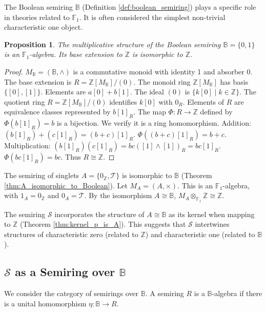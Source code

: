 \documentclass[11pt, a4paper]{article}
\theoremstyle{plain}
\newtheorem{proposition}[theorem]{Proposition}
\theoremstyle{definition}
\numberwithin{equation}{section}
\newcommand{\Z}{\mathbb{Z}}
\newcommand{\Tobj}{\mathcal{T}} %
\newcommand{\SemiringS}{\mathcal{S}}
\newcommand{\Bool}{\mathbb{B}}
\newcommand{\FOne}{\mathbb{F}_1}
\begin{document}
The Boolean semiring $\Bool$ (Definition \ref{def:boolean_semiring}) plays a specific role in theories related to $\FOne$. It is often considered the simplest non-trivial characteristic one object.

\begin{proposition}
The multiplicative structure of the Boolean semiring $\Bool=\{0, 1\}$ is an $\FOne$-algebra. Its base extension to $\Z$ is isomorphic to $\Z$.
\end{proposition}
\begin{proof}
$M_{\Bool} = (\Bool, \wedge)$ is a commutative monoid with identity 1 and absorber 0.
The base extension is $R = \Z[M_{\Bool}]/(0)$.
The monoid ring $\Z[M_{\Bool}]$ has basis $\{[0], [1]\}$. Elements are $a[0]+b[1]$.
The ideal $(0)$ is $\{ k[0] \mid k \in \Z\}$.
The quotient ring $R=\Z[M_{\Bool}]/(0)$ identifies $k[0]$ with $0_R$.
Elements of $R$ are equivalence classes represented by $b[1]_R$.
The map $\Phi: R \to \Z$ defined by $\Phi(b[1]_R) = b$ is a bijection.
We verify it is a ring homomorphism.
Addition: $(b[1]_R)+(c[1]_R) = (b+c)[1]_R$. $\Phi((b+c)[1]_R) = b+c$.
Multiplication: $(b[1]_R)(c[1]_R) = bc([1]\wedge[1])_R = bc[1]_R$. $\Phi(bc[1]_R) = bc$.
Thus $R \cong \Z$.
\end{proof}

The semiring of singlets $A=\{0_{\Z}, \Tobj\}$ is isomorphic to $\Bool$ (Theorem \ref{thm:A_isomorphic_to_Boolean}). Let $M_A = (A, \times)$. This is an $\FOne$-algebra, with $1_A=0_{\Z}$ and $0_A=\Tobj$.
By the isomorphism $A \cong \Bool$, $M_A \otimes_{\FOne} \Z \cong \Z$.

The semiring $\SemiringS$ incorporates the structure of $A \cong \Bool$ as its kernel when mapping to $\Z$ (Theorem \ref{thm:kernel_p_is_A}). This suggests that $\SemiringS$ intertwines structures of characteristic zero (related to $\Z$) and characteristic one (related to $\Bool$).

\subsection{\texorpdfstring{$\SemiringS$}{S} as a Semiring over \texorpdfstring{$\Bool$}{B}}

We consider the category of semirings over $\Bool$. A semiring $R$ is a $\Bool$-algebra if there is a unital homomorphism $\eta: \Bool \to R$.
\end{document}
